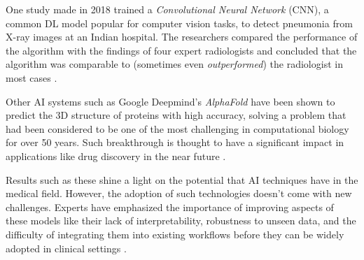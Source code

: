 \documentclass[../main.tex]{subfiles}
\begin{document}
    One study made in 2018 trained a \textit{Convolutional Neural Network} (CNN), a common DL model popular for computer vision tasks, to detect pneumonia from X-ray images at an Indian hospital. The researchers compared the performance of the algorithm with the findings of four expert radiologists and concluded that the algorithm was comparable to (sometimes even \textit{outperformed}) the radiologist in most cases \cite{wang_chestx-ray8_2017}.

    \clearpage

    \begin{table}[h]
   \end{table}

    Other AI systems such as Google Deepmind's \textit{AlphaFold} \cite{yang_alphafold2_2023} have been shown to predict the 3D structure of proteins with high accuracy, solving a problem that had been considered to be one of the most challenging in computational biology for over 50 years. Such breakthrough is thought to have a significant impact in applications like drug discovery in the near future \cite{jumper_highly_2021}.
    
    Results such as these shine a light on the potential that AI techniques have in the medical field. However, the adoption of such technologies doesn't come with new challenges. Experts have emphasized the importance of improving aspects of these models like their lack of interpretability, robustness to unseen data, and the difficulty of integrating them into existing workflows before they can be widely adopted in clinical settings \cite{esteva_deep_2021, topol_high-performance_2019}.
    
\end{document}
